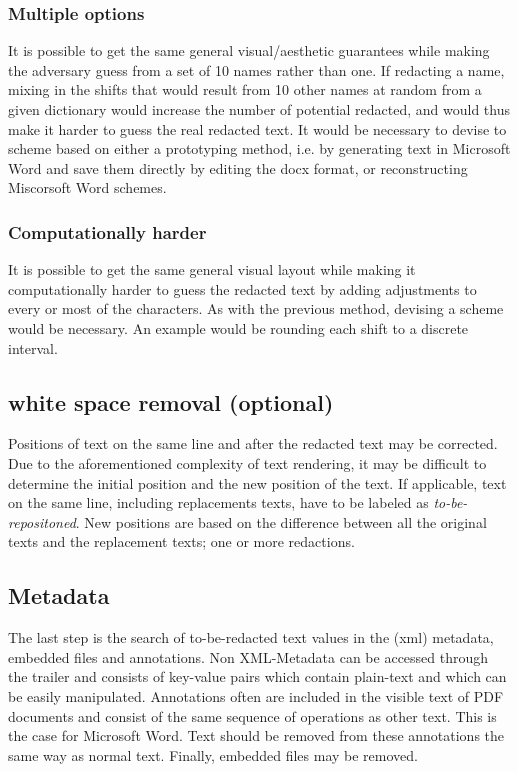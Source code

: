 \subsubsection{Multiple options}
It is possible to get the same general visual/aesthetic guarantees while making the adversary guess from a set of 10 names rather than one. If redacting a name, mixing in the shifts that would result from 10 other names at random from a given dictionary would increase the number of potential redacted, and would thus make it harder to guess the real redacted text. It would be necessary to devise to scheme based on either a prototyping method, i.e. by generating text in Microsoft Word and save them directly by editing the docx format, or reconstructing Miscorsoft Word schemes.  

\subsubsection{Computationally harder}
It is possible to get the same general visual layout while making it computationally harder to guess the redacted text by adding adjustments to every or most of the characters. As with the previous method, devising a scheme would be necessary. An example would be rounding each shift to a discrete interval.

\subsection{white space removal (optional)}
Positions of text on the same line and after the redacted text may be corrected. Due to the aforementioned complexity of text rendering, it may be difficult to determine the initial position and the new position of the text. If applicable, text on the same line, including replacements texts, have to be labeled as \textit{to-be-repositoned}. New positions are based on the difference between all the original texts and the replacement texts; one or more redactions. 

\subsection{Metadata}
The last step is the search of to-be-redacted text values in the (xml) metadata, embedded files and annotations. Non XML-Metadata can be accessed through the trailer and consists of key-value pairs which contain plain-text and which can be easily manipulated. Annotations often are included in the visible text of PDF documents and consist of the same sequence of operations as other text. This is the case for Microsoft Word. Text should be removed from these annotations the same way as normal text. Finally, embedded files may be removed. 
